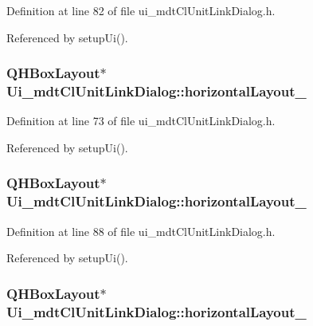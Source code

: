 Definition at line 82 of file ui\-\_\-mdt\-Cl\-Unit\-Link\-Dialog.\-h.



Referenced by setup\-Ui().

\hypertarget{class_ui__mdt_cl_unit_link_dialog_a890e443f4efd50ec7387451fc527b843}{
\subsubsection[{horizontal\-Layout\-\_\-5}]{\setlength{\rightskip}{0pt plus 5cm}Q\-H\-Box\-Layout$\ast$ Ui\-\_\-mdt\-Cl\-Unit\-Link\-Dialog\-::horizontal\-Layout\-\_}}\label{class_ui__mdt_cl_unit_link_dialog_a890e443f4efd50ec7387451fc527b843}


Definition at line 73 of file ui\-\_\-mdt\-Cl\-Unit\-Link\-Dialog.\-h.



Referenced by setup\-Ui().

\hypertarget{class_ui__mdt_cl_unit_link_dialog_a1e7a1e276f9f01e0f25f46d7bfe7e8f9}{
\subsubsection[{horizontal\-Layout\-\_\-6}]{\setlength{\rightskip}{0pt plus 5cm}Q\-H\-Box\-Layout$\ast$ Ui\-\_\-mdt\-Cl\-Unit\-Link\-Dialog\-::horizontal\-Layout\-\_}}\label{class_ui__mdt_cl_unit_link_dialog_a1e7a1e276f9f01e0f25f46d7bfe7e8f9}


Definition at line 88 of file ui\-\_\-mdt\-Cl\-Unit\-Link\-Dialog.\-h.



Referenced by setup\-Ui().

\hypertarget{class_ui__mdt_cl_unit_link_dialog_a5dc8658ee13e78ddf394d0751acb8e92}{
\subsubsection[{horizontal\-Layout\-\_\-7}]{\setlength{\rightskip}{0pt plus 5cm}Q\-H\-Box\-Layout$\ast$ Ui\-\_\-mdt\-Cl\-Unit\-Link\-Dialog\-::horizontal\-Layout\-\_}}\label{class_ui__mdt_cl_unit_link_dialog_a5dc8658ee13e78ddf394d0751acb8e92}


